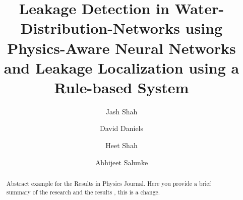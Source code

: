 \documentclass[final,5p,times,twocolumn,authoryear]{elsarticle}
\begin{document}
\begin{frontmatter}



\title{Leakage Detection in Water-Distribution-Networks using Physics-Aware Neural Networks and Leakage Localization using a Rule-based System}



\author[inst1,eq]{Jash Shah}
\author[inst1,eq]{David Daniels}
\author[inst1,eq]{Heet Shah}
\author[inst1,eq]{Abhijeet Salunke}

\vspace{0.3cm}



\begin{abstract}
Abstract example for the Results in Physics Journal. Here you provide a brief summary of the research and the results , this is a change.
\end{abstract}


\end{frontmatter}
\end{document}
